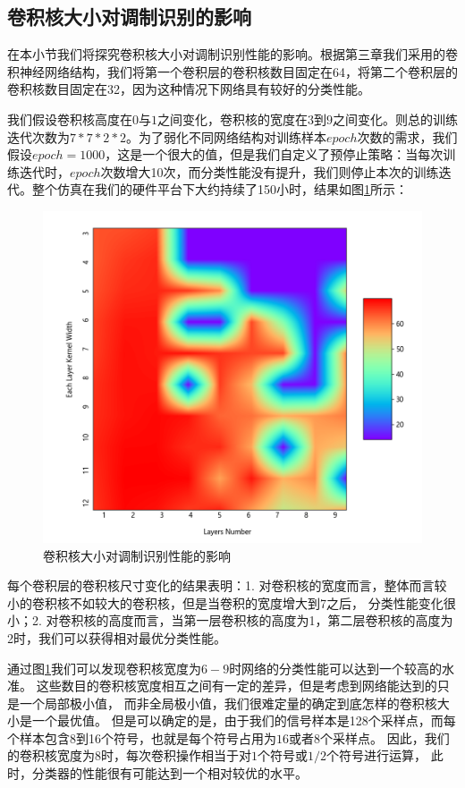 \subsection{卷积核大小对调制识别的影响}
在本小节我们将探究卷积核大小对调制识别性能的影响。根据第三章我们采用的卷积神经网络结构，我们将第一个卷积层的卷积核数目固定在64，将第二个卷积层的卷积核数目固定在32，因为这种情况下网络具有较好的分类性能。\par
我们假设卷积核高度在$0$与$1$之间变化，卷积核的宽度在$3$到$9$之间变化。则总的训练迭代次数为$7 * 7 * 2 * 2$。为了弱化不同网络结构对训练样本$epoch$次数的需求，我们假设$epoch=1000$，这是一个很大的值，但是我们自定义了预停止策略：当每次训练迭代时，$epoch$次数增大10次，而分类性能没有提升，我们则停止本次的训练迭代。整个仿真在我们的硬件平台下大约持续了150小时，结果如图\ref{sec:fig_5_2}所示：\par
\begin{figure}[!h]
	\centering
	\includegraphics[scale=1.1]{figures/chapter_5/fig_5_2}
	\caption{卷积核大小对调制识别性能的影响}\label{sec:fig_5_2}
\end{figure}
每个卷积层的卷积核尺寸变化的结果表明：1. 对卷积核的宽度而言，整体而言较小的卷积核不如较大的卷积核，但是当卷积的宽度增大到7之后，
分类性能变化很小；2. 对卷积核的高度而言，当第一层卷积核的高度为1，第二层卷积核的高度为2时，我们可以获得相对最优分类性能。\par

通过图\ref{sec:fig_5_2}我们可以发现卷积核宽度为$6-9$时网络的分类性能可以达到一个较高的水准。
这些数目的卷积核宽度相互之间有一定的差异，但是考虑到网络能达到的只是一个局部极小值，
而非全局极小值，我们很难定量的确定到底怎样的卷积核大小是一个最优值。
但是可以确定的是，由于我们的信号样本是128个采样点，而每个样本包含8到16个符号，也就是每个符号占用为$16$或者$8$个采样点。
因此，我们的卷积核宽度为$8$时，每次卷积操作相当于对$1$个符号或$1/2$个符号进行运算，
此时，分类器的性能很有可能达到一个相对较优的水平。\par


